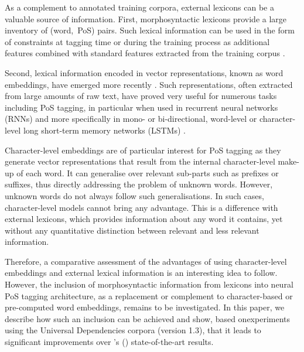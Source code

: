 \documentclass[11pt,a4paper]{article}
\newcommand\hm[1]{\textcolor{blue}{#1}}
\begin{document}
As a complement to  annotated training corpora, external lexicons can be a valuable source of information.
First, morphosyntactic lexicons provide a large inventory of (word,~PoS)
pairs. Such lexical information can be used in the form of constraints at tagging time \cite{kim99,hajic00tagging} or
during the training process as additional features combined with standard features extracted from the training corpus
\cite{chrupala08,goldberg09,denis12}.

Second, lexical information encoded in vector representations, known as word embeddings, have emerged more
recently \cite{bengio03,collobert08,chrupala13,ling15,ballesteros15,muller15}. Such representations, often
extracted from large amounts of raw text, have proved very useful for numerous tasks including PoS tagging, in
particular when used in recurrent neural networks (RNNs) and more specifically in mono- or bi-directional, word-level or
character-level long short-term memory networks (LSTMs) \cite{hochreiter97,ling15,ballesteros15,plank16}.

Character-level embeddings are of particular interest for PoS tagging as they generate vector representations that
result from the internal character-level make-up of each word. It can generalise over relevant sub-parts such as
prefixes or suffixes, thus directly addressing the problem of unknown words. However, unknown words do not always follow
such generalisations. In such cases, character-level models cannot bring any advantage. This is a difference with
external lexicons, which provides information about any word it contains, yet without any quantitative distinction
between relevant and less relevant information.

Therefore, a comparative assessment of the advantages of using character-level embeddings and external lexical
information is an interesting idea to follow. However, the inclusion of morphosyntactic information from lexicons
into neural PoS tagging architecture, as a replacement or complement to character-based or pre-computed word embeddings,
remains to be investigated. In this paper, we describe how such an inclusion can be achieved and show, %
 based onexperiments using the Universal Dependencies corpora (version 1.3), 
that it leads to significant
improvements over \citeauthor{plank16}'s (\citeyear{plank16}) state-of-the-art results.

\end{document}

